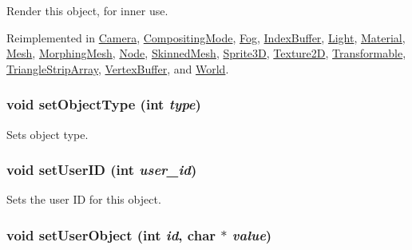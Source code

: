 Render this object, for inner use. 

Reimplemented in \hyperlink{classm3g_1_1Camera_8babc8a79b78615da51161e94029eea9}{Camera}, \hyperlink{classm3g_1_1CompositingMode_8babc8a79b78615da51161e94029eea9}{CompositingMode}, \hyperlink{classm3g_1_1Fog_8babc8a79b78615da51161e94029eea9}{Fog}, \hyperlink{classm3g_1_1IndexBuffer_8babc8a79b78615da51161e94029eea9}{IndexBuffer}, \hyperlink{classm3g_1_1Light_8babc8a79b78615da51161e94029eea9}{Light}, \hyperlink{classm3g_1_1Material_8babc8a79b78615da51161e94029eea9}{Material}, \hyperlink{classm3g_1_1Mesh_8babc8a79b78615da51161e94029eea9}{Mesh}, \hyperlink{classm3g_1_1MorphingMesh_8babc8a79b78615da51161e94029eea9}{MorphingMesh}, \hyperlink{classm3g_1_1Node_8babc8a79b78615da51161e94029eea9}{Node}, \hyperlink{classm3g_1_1SkinnedMesh_8babc8a79b78615da51161e94029eea9}{SkinnedMesh}, \hyperlink{classm3g_1_1Sprite3D_8babc8a79b78615da51161e94029eea9}{Sprite3D}, \hyperlink{classm3g_1_1Texture2D_8babc8a79b78615da51161e94029eea9}{Texture2D}, \hyperlink{classm3g_1_1Transformable_8babc8a79b78615da51161e94029eea9}{Transformable}, \hyperlink{classm3g_1_1TriangleStripArray_8babc8a79b78615da51161e94029eea9}{TriangleStripArray}, \hyperlink{classm3g_1_1VertexBuffer_8babc8a79b78615da51161e94029eea9}{VertexBuffer}, and \hyperlink{classm3g_1_1World_8babc8a79b78615da51161e94029eea9}{World}.\hypertarget{classm3g_1_1Object3D_777701a101d1332abffa2ad6a255b91d}{
\subsubsection[{setObjectType}]{\setlength{\rightskip}{0pt plus 5cm}void setObjectType (int {\em type})}}
\label{classm3g_1_1Object3D_777701a101d1332abffa2ad6a255b91d}


Sets object type. \hypertarget{classm3g_1_1Object3D_8eaa86665b4ca2c39691b6efc50108ee}{
\subsubsection[{setUserID}]{\setlength{\rightskip}{0pt plus 5cm}void setUserID (int {\em user\_\-id})}}
\label{classm3g_1_1Object3D_8eaa86665b4ca2c39691b6efc50108ee}


Sets the user ID for this object. \hypertarget{classm3g_1_1Object3D_990adc7f146e1b5d229e1d8fc3625a24}{
\subsubsection[{setUserObject}]{\setlength{\rightskip}{0pt plus 5cm}void setUserObject (int {\em id}, \/  char $\ast$ {\em value})}}
\label{classm3g_1_1Object3D_990adc7f146e1b5d229e1d8fc3625a24}


